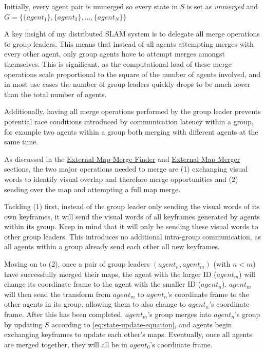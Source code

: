 Initially, every agent pair is unmerged so every state in $S$ is set as \textit{unmerged} and $G=\{\{agent_1\}, \{agent_2\}, ..., \{agent_N\}\}$

A key insight of my distributed SLAM system is to delegate all merge operations to group leaders. This means that instead of all agents attempting merges with every other agent, only group agents have to attempt merges amongst themselves. This is significant, as the computational load of these merge operations scale proportional to the square of the number of agents involved, and in most use cases the number of group leaders quickly drops to be much lower than the total number of agents.

Additionally, having all merge operations performed by the group leader prevents potential race conditions introduced by communication latency within a group, for example two agents within a group both merging with different agents at the same time.

As discussed in the \hyperref[sec:external-map-merge-finder]{External Map Merge Finder} and \hyperref[sec:external-map-merger]{External Map Merger} sections, the two major operations needed to merge are (1) exchanging visual words to identify visual overlap and therefore merge opportunities and (2) sending over the map and attempting a full map merge.

Tackling (1) first, instead of the group leader only sending the visual words of its own keyframes, it will send the visual words of all keyframes generated by agents within its group. Keep in mind that it will only be sending these visual words to other group leaders. This introduces no additional intra-group communication, as all agents within a group already send each other all new keyframes.

Moving on to (2), once a pair of group leaders $(agent_n, agent_m)$ (with $n<m$) have successfully merged their maps, the agent with the larger ID ($agent_m$) will change its coordinate frame to the agent with the smaller ID ($agent_n$). $agent_m$ will then send the transform from $agent_m$ to $agent_n$'s coordinate frame to the other agents in its group, allowing them to also change to $agent_n$'s coordinate frame. After this has been completed, $agent_m$'s group merges into $agent_n$'s group by updating $S$ according to \autoref{eq:state-update-equation}, and agents begin exchanging keyframes to update each other's maps. Eventually, once all agents are merged together, they will all be in $agent_0$'s coordinate frame.

